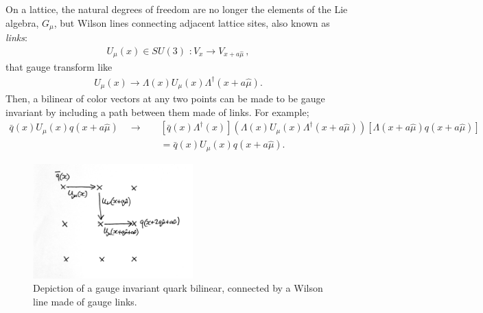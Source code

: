 On a lattice, the natural degrees of freedom are no longer the elements of the Lie algebra, $G_{\mu}$, but Wilson lines connecting adjacent lattice sites, also known as {\it{links}}:
\begin{align}
  U_{\mu}(x) \in SU(3)\,\,: V_x \to V_{x+a\hat{\mu}}\,,
\end{align}
that gauge transform like
\begin{align}
  U_{\mu}(x) \to \Lambda(x) U_{\mu}(x) \Lambda^{\dagger}(x+a\hat{\mu}).
\end{align}
Then, a bilinear of color vectors at any two points can be made to be gauge invariant by including a path between them made of links. For example;
\begin{align}
  \nonumber
  \bar{q}(x)U_{\mu}(x)q(x+a\hat{\mu}) \quad \to\quad &[\bar{q}(x)\Lambda^{\dagger}(x)](\Lambda(x) U_{\mu}(x) \Lambda^{\dagger}(x+a\hat{\mu})) [\Lambda(x+a\hat{\mu})q(x+a\hat{\mu})]
  \\
  &= \bar{q}(x)U_{\mu}(x)q(x+a\hat{\mu}).
\end{align}

\begin{figure}[htb!]
  \begin{center}
    \hspace{+20pt}
    \vspace{-10pt}
    \includegraphics[width=0.55\textwidth]{images/wilson_line.jpg}
    \caption{Depiction of a gauge invariant quark bilinear, connected by a Wilson line made of gauge links.}
  \end{center}
  \vspace{-10pt}
\end{figure}

